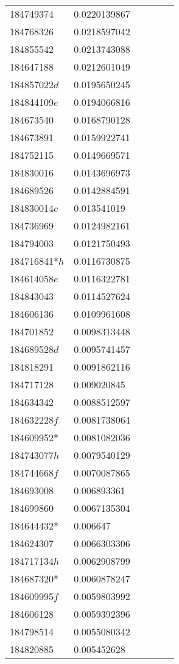 \begin{landscape}
\begin{longtable}{p{1.8cm}p{2cm}p{2.2cm}p{1cm}p{2.8cm}p{12.3cm}}
184749374&0.0220139867&&&& \\
184768326&0.0218597042&&&& \\
184855542&0.0213743088&&&& \\
184647188&0.0212601049&&&& \\
184857022$d$&0.0195650245&&&& \\
184844109$e$&0.0194066816&&&& \\
184673540&0.0168790128&&&& \\
184673891&0.0159922741&&&& \\
184752115&0.0149669571&&&& \\
184830016&0.0143696973&&&& \\
184689526&0.0142884591&&&& \\
184830014$c$&0.013541019&&&& \\
184736969&0.0124982161&&&& \\
184794003&0.0121750493&&&& \\
184716841*$h$&0.0116730875&&&& \\
184614058$e$&0.0116322781&&&& \\
184843043&0.0114527624&&&& \\
184606136&0.0109961608&&&& \\
184701852&0.0098313448&&&& \\
184689528$d$&0.0095741457&&&& \\
184818291&0.0091862116&&&& \\
184717128&0.009020845&&&& \\
184634342&0.0088512597&&&& \\
184632228$f$&0.0081738064&&&& \\
184609952*&0.0081082036&&&& \\
184743077$h$&0.0079540129&&&& \\
184744668$f$&0.0070087865&&&& \\
184693008&0.006893361&&&& \\
184699860&0.0067135304&&&& \\
184644432*&0.006647&&&& \\
184624307&0.0066303306&&&& \\
184717134$h$&0.0062908799&&&& \\
184687320*&0.0060878247&&&& \\
184609995$f$&0.0059803992&&&& \\
184606128&0.0059392396&&&& \\
184798514&0.0055080342&&&& \\
184820885&0.005452628&&&& \\

\end{longtable}
\end{landscape}
